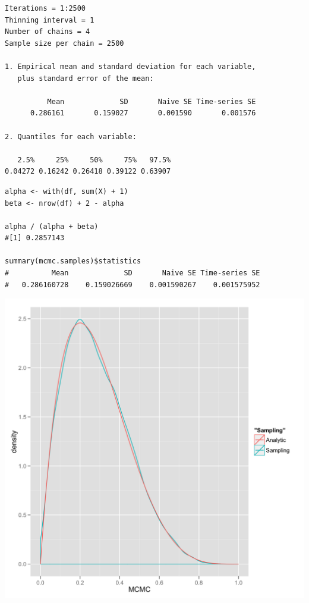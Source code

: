 \documentclass{beamer}
\begin{document}
\begin{frame}[fragile]
  \begin{verbatim}
Iterations = 1:2500
Thinning interval = 1 
Number of chains = 4 
Sample size per chain = 2500 

1. Empirical mean and standard deviation for each variable,
   plus standard error of the mean:

          Mean             SD       Naive SE Time-series SE 
      0.286161       0.159027       0.001590       0.001576 

2. Quantiles for each variable:

   2.5%     25%     50%     75%   97.5% 
0.04272 0.16242 0.26418 0.39122 0.63907 
  \end{verbatim}
\end{frame}

\begin{frame}[fragile]
  \begin{verbatim}
alpha <- with(df, sum(X) + 1)
beta <- nrow(df) + 2 - alpha

alpha / (alpha + beta)
#[1] 0.2857143

summary(mcmc.samples)$statistics
#          Mean             SD       Naive SE Time-series SE 
#   0.286160728    0.159026669    0.001590267    0.001575952 
  \end{verbatim}
\end{frame}

\begin{frame}[fragile]
  \begin{center}
    \includegraphics[scale = 0.1]{../graphs/binomial/density.png}
  \end{center}
\end{frame}
\end{document}
